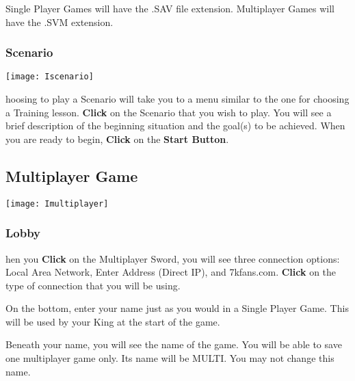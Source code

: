 
Single Player Games will have the .SAV file extension. Multiplayer Games will have the .SVM extension.

\subsubsection{Scenario}


\begin{center}
    \texttt{[image: Iscenario]} %
\end{center}

hoosing to play a Scenario will take you to a menu similar to the one for choosing a Training lesson. \textbf{Click} on the Scenario that you wish to play. You will see a brief description of the beginning situation and the goal(s) to be achieved. When you are ready to begin, \textbf{Click} on the \textbf{Start Button}.

\subsection{Multiplayer Game}



\begin{center}
    \texttt{[image: Imultiplayer]} %
\end{center}

\subsubsection{Lobby} %

hen you \textbf{Click} on the Multiplayer Sword, you will see three connection options: Local Area Network, Enter Address (Direct IP), and 7kfans.com. \textbf{Click} on the type of connection that you will be using.

On the bottom, enter your name just as you would in a Single Player Game. This will be used by your King at the start of the game.

Beneath your name, you will see the name of the game. You will be able to save one multiplayer game only. Its name will be MULTI. You may not change this name.

